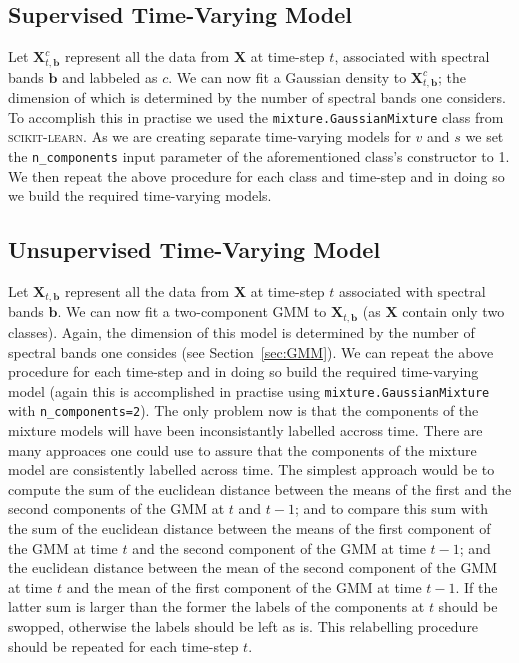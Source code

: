 \documentclass{article}
\begin{document}
\subsection{Supervised Time-Varying Model}
\label{sec:sup_model}
Let $\mathbf{X}_{t,\mathbf{b}}^c$ represent all the data from $\mathbf{X}$ at time-step $t$, associated with spectral bands $\mathbf{b}$ and labbeled as $c$. We can now fit a Gaussian density 
to $\mathbf{X}_{t,\mathbf{b}}^c$; the dimension of which is determined by the number of spectral bands one considers. To accomplish this in practise we used the \texttt{mixture.GaussianMixture} class from \textsc{scikit-learn}. 
As we are creating separate time-varying models for $v$ and $s$ we set the \texttt{n\_components} input parameter of the aforementioned class's constructor to 1. We then repeat the above procedure for each class and time-step and in 
doing so we build the required time-varying models. %

\subsection{Unsupervised Time-Varying Model}
Let $\mathbf{X}_{t,\mathbf{b}}$ represent all the data from $\mathbf{X}$ at time-step $t$ associated with spectral bands $\mathbf{b}$. We can now fit a two-component GMM to $\mathbf{X}_{t,\mathbf{b}}$ (as $\mathbf{X}$ contain only two classes). Again,
the dimension of this model is determined by the number of spectral bands one consides (see Section~\ref{sec:GMM}). We can repeat the above procedure for each time-step and in doing so 
build the required time-varying model (again this is accomplished in practise using \texttt{mixture.GaussianMixture} with \texttt{n\_components=2}). The only problem now is that the components of the mixture models will have been inconsistantly labelled accross time. There are many approaces one could use to assure 
that the components of the mixture model are consistently labelled across time. The simplest approach would be to compute the sum of the euclidean distance between the means of 
the first and the second components of the GMM at $t$ and $t-1$; and to compare this sum with the sum of the euclidean distance between the means of the first component of the GMM at time $t$ and 
the second component of the GMM at time $t-1$; and the euclidean distance between the mean of the second component of the GMM at time $t$ and the mean of the first component of the GMM at time $t-1$. If the latter sum is 
larger than the former the labels of the components at $t$ should be swopped, otherwise the labels should be left as is. This relabelling procedure should be repeated for each time-step $t$.
\end{document}
